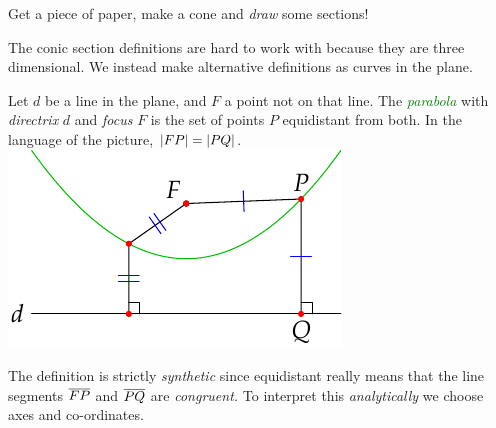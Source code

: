

\begin{tcolorbox}[exercisestyle,title={Exercise}\quad]
Get a piece of paper, make a cone and \emph{draw} some sections!
\end{tcolorbox}

The conic section definitions are hard to work with because they are three dimensional. We instead make alternative definitions as curves in the plane.


\begin{defn}[lower separated=false, sidebyside, sidebyside align=top seam, sidebyside gap=0pt, righthand width=0.35\linewidth]{}{}
Let $d$ be a line in the plane, and $F$ a point not on that line. The \emph{\textcolor{Green}{parabola}} with \emph{directrix} $d$ and \emph{focus} $F$ is the set of points $P$ equidistant from both.\smallbreak
In the language of the picture, $\left| FP\right|=\left| PQ\right|$.
\tcblower
\flushright\includegraphics{parabola1}
\end{defn}

The definition is strictly \emph{synthetic} since equidistant really means that the line segments $\overline{FP}$ and $\overline{PQ}$ are \emph{congruent.} To interpret this \emph{analytically} we choose axes and co-ordinates.

